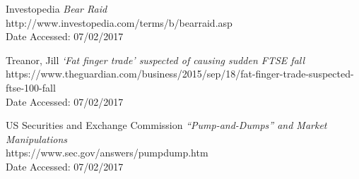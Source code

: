 \documentclass[11pt, oneside, a4paper]{article}
\begin{document}
\newpage
\begin{thebibliography}

	\item Investopedia {\em Bear Raid} \\
	http://www.investopedia.com/terms/b/bearraid.asp \\
	Date Accessed: 07/02/2017
	\item Treanor, Jill {\em `Fat finger trade' suspected of causing sudden FTSE fall} \\
	https://www.theguardian.com/business/2015/sep/18/fat-finger-trade-suspected-ftse-100-fall \\
	Date Accessed: 07/02/2017
	\item US Securities and Exchange Commission {\em ``Pump-and-Dumps'' and Market Manipulations} \\
	https://www.sec.gov/answers/pumpdump.htm \\
	Date Accessed: 07/02/2017
\end{thebibliography}

\newpage
\appendix
\end{document}
